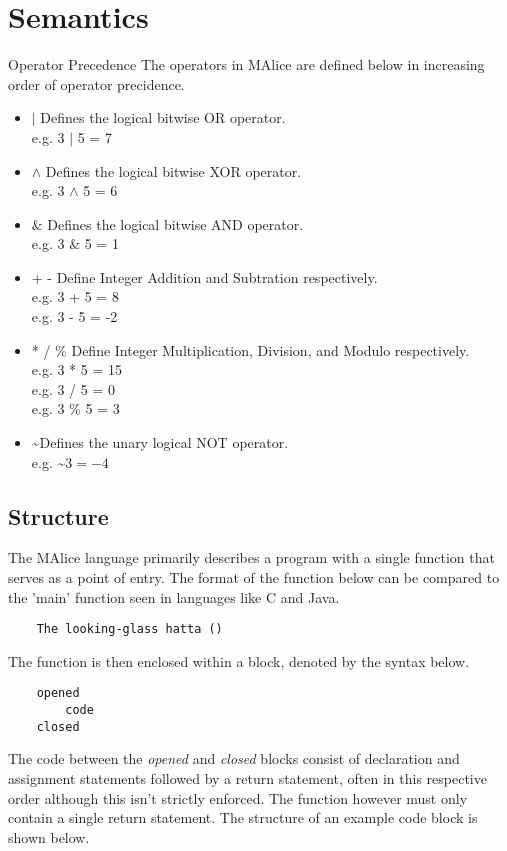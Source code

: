 \documentclass[a4wide, 10pt]{article}
\newcommand{\tab}{\hspace*{2em}}
\begin{document}
\section{Semantics}
Operator Precedence
The operators in MAlice are defined below in increasing order of operator precidence.
\begin{itemize}
	\item
	$|$ Defines the logical bitwise OR operator. 
	\\ \tab e.g. 3 $|$ 5 = 7
	\item
	$\land$ Defines the logical bitwise XOR operator. 
	\\ \tab e.g. 3 $\land$ 5 = 6
	\item
	$\&$ Defines the logical bitwise AND operator. 
	\\ \tab e.g. 3 $\&$ 5 = 1
	\item
	+ - Define Integer Addition and Subtration respectively. 
	\\ \tab e.g. 3 + 5 = 8 \\ \tab e.g. 3 - 5 = -2
	\item
	* / \% Define Integer Multiplication, Division, and Modulo respectively. 
	\\ \tab e.g. 3 * 5 = 15 \\ \tab e.g. 3 / 5 = 0 \\ \tab e.g. 3 \% 5 = 3
	\item
	\textasciitilde  Defines the unary logical NOT operator.
	\\ \tab e.g. \textasciitilde$ 3 = -4$
\end{itemize}

\subsection{Structure}
The MAlice language primarily describes a program with a single function 
that serves as a point of entry. The format of the function below can be
compared to the 'main' function seen in languages like C and Java.

\begin{verbatim}
    The looking-glass hatta ()
\end{verbatim}

The function is then enclosed within a block, denoted by the syntax below.
\begin{verbatim}
    opened
        code
    closed
\end{verbatim}

The code between the \emph{opened} and \emph{closed} blocks consist of 
declaration and assignment statements followed by a return statement, 
often in this respective order although this isn't strictly enforced. The
function however must only contain a single return statement. The structure
of an example code block is shown below.
\end{document}

